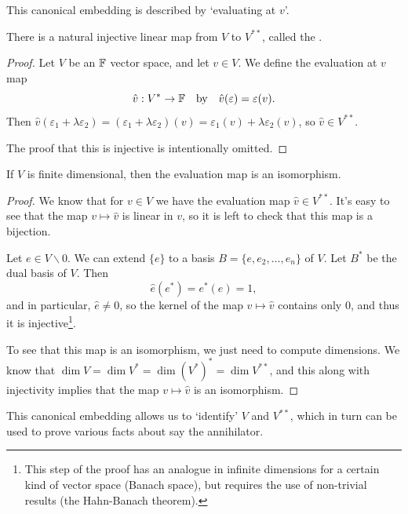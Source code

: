 \documentclass[a4paper]{scrartcl}
\begin{document}
\begin{center}
\begin{tikzpicture}[x=0.75pt,y=0.75pt,yscale=-1,xscale=1]
\end{tikzpicture}

\end{center}

This canonical embedding is described by `evaluating at $v$'.

\begin{theorem}
    There is a natural injective linear map from $V$ to $V^{**}$, called the .
\end{theorem}
\begin{proof}
Let $V$ be an $\mathbb{F}$ vector space, and let $v \in V$.
We define the evaluation at $v$ map
$$
\hat{v}: V^* \rightarrow \mathbb{F} \quad \text{by} \quad \hat{v}(\varepsilon) = \varepsilon(v).
$$
Then $\hat{v}(\varepsilon_1 + \lambda \varepsilon_2) = (\varepsilon_1 + \lambda \varepsilon_2)(v) = \varepsilon_1(v) + \lambda \varepsilon_2(v)$, so $\hat{v} \in V^{**}$.

The proof that this is injective is intentionally omitted.
\end{proof}


\begin{theorem}
    If $V$ is finite dimensional, then the evaluation map is an isomorphism.
\end{theorem}
\begin{proof}
    We know that for $v \in V$ we have the evaluation map $\hat{v} \in V^{**}$. It's easy to see that the map $v \mapsto \hat{v}$ is linear in $v$, so it is left to check that this map is a bijection.

    Let $e \in V \backslash {0}$. We can extend $\{e\}$ to a basis $B = \{e, e_2, \dots, e_n\}$ of $V$. Let $B^*$ be the dual basis of $V$. 
    Then
    $$
    \hat{e}(e^*) = e^*(e) = 1,
    $$
    and in particular, $\hat{e} \neq 0$, so the kernel of the map $v \mapsto \hat{v}$ contains only $0$, and thus it is injective\footnote{This step of the proof has an analogue in infinite dimensions for a certain kind of vector space (Banach space), but requires the use of non-trivial results (the Hahn-Banach theorem).}.

    To see that this map is an isomorphism, we just need to compute dimensions. We know that $\dim V = \dim V^* = \dim (V^*)^* = \dim V^{**}$, and this along with injectivity implies that the map $v \mapsto \hat{v}$ is an isomorphism.
\end{proof}

This canonical embedding allows us to `identify' $V$ and $V^{**}$, which in turn can be used to prove various facts about say the annihilator.
\end{document}
